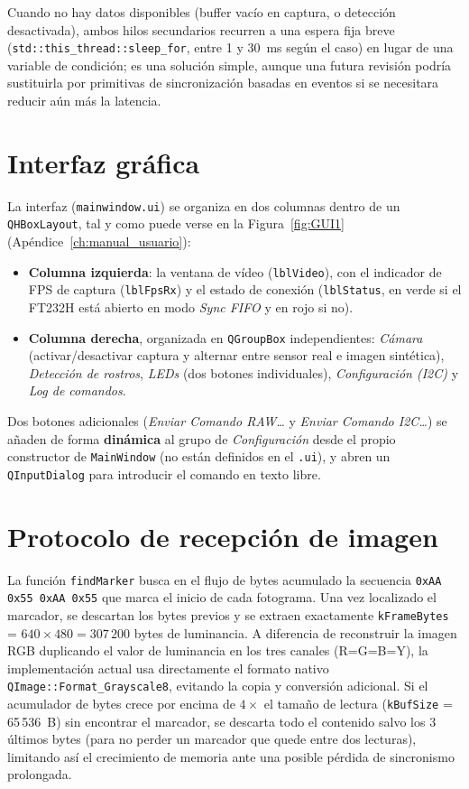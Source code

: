 \documentclass[../main.tex]{subfiles}
\begin{document}
Cuando no hay datos disponibles (buffer vacío en captura, o detección desactivada), ambos hilos secundarios recurren a una espera fija breve (\texttt{std::this\_thread::sleep\_for}, entre 1 y 30~ms según el caso) en lugar de una variable de condición; es una solución simple, aunque una futura revisión podría sustituirla por primitivas de sincronización basadas en eventos si se necesitara reducir aún más la latencia.

\section{Interfaz gráfica}
\label{sec:gui_software}

La interfaz (\texttt{mainwindow.ui}) se organiza en dos columnas dentro de un \texttt{QHBoxLayout}, tal y como puede verse en la Figura~\ref{fig:GUI1} (Apéndice~\ref{ch:manual_usuario}):

\begin{itemize}
    \item \textbf{Columna izquierda}: la ventana de vídeo (\texttt{lblVideo}), con el indicador de \ac{FPS} de captura (\texttt{lblFpsRx}) y el estado de conexión (\texttt{lblStatus}, en verde si el FT232H está abierto en modo \textit{Sync FIFO} y en rojo si no).
    \item \textbf{Columna derecha}, organizada en \texttt{QGroupBox} independientes: \textit{Cámara} (activar/desactivar captura y alternar entre sensor real e imagen sintética), \textit{Detección de rostros}, \textit{LEDs} (dos botones individuales), \textit{Configuración (I2C)} y \textit{Log de comandos}.
\end{itemize}

Dos botones adicionales (\textit{Enviar Comando RAW\ldots} y \textit{Enviar Comando I2C\ldots}) se añaden de forma \textbf{dinámica} al grupo de \textit{Configuración} desde el propio constructor de \texttt{MainWindow} (no están definidos en el \texttt{.ui}), y abren un \texttt{QInputDialog} para introducir el comando en texto libre.

\section{Protocolo de recepción de imagen}
\label{sec:protocolo_recepcion}

La función \texttt{findMarker} busca en el flujo de bytes acumulado la secuencia \texttt{0xAA 0x55 0xAA 0x55} que marca el inicio de cada fotograma. Una vez localizado el marcador, se descartan los bytes previos y se extraen exactamente \texttt{kFrameBytes} = $640 \times 480 = 307\,200$ bytes de luminancia. A diferencia de reconstruir la imagen RGB duplicando el valor de luminancia en los tres canales (R=G=B=Y), la implementación actual usa directamente el formato nativo \texttt{QImage::Format\_Grayscale8}, evitando la copia y conversión adicional. Si el acumulador de bytes crece por encima de $4\times$ el tamaño de lectura (\texttt{kBufSize} = 65\,536~B) sin encontrar el marcador, se descarta todo el contenido salvo los 3 últimos bytes (para no perder un marcador que quede entre dos lecturas), limitando así el crecimiento de memoria ante una posible pérdida de sincronismo prolongada.
\end{document}
